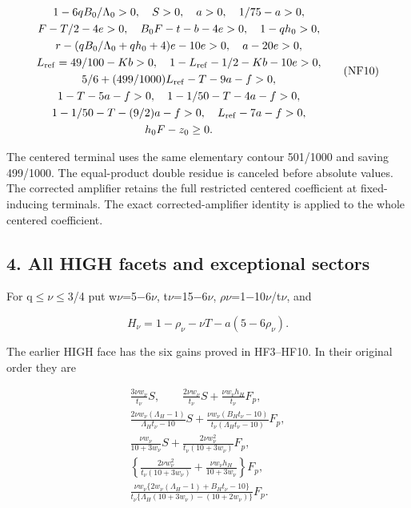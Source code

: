 \[
\begin{gathered}
1-6qB_0/\Lambda_0>0,\quad S>0,\quad a>0,\quad1/75-a>0,\\
F-T/2-4e>0,\quad B_0F-t-b-4e>0,\quad1-qh_0>0,\\
r-(qB_0/\Lambda_0+qh_0+4)e-10e>0,\quad a-20e>0,\\
L_{\rm ref}=49/100-Kb>0,\quad
1-L_{\rm ref}-1/2-Kb-10e>0,\\
5/6+(499/1000)L_{\rm ref}-T-9a-f>0,\\
1-T-5a-f>0,\quad1-1/50-T-4a-f>0,\\
1-1/50-T-(9/2)a-f>0,\quad L_{\rm ref}-7a-f>0,\\
h_0F-z_0\ge0.
\end{gathered}
\tag{NF10}
\]

The centered terminal uses the same elementary contour 501/1000 and saving 499/1000. The equal-product double residue is canceled before absolute values. The corrected amplifier retains the full restricted centered coefficient at fixed-inducing terminals. The exact corrected-amplifier identity is applied to the whole centered coefficient.

\hypertarget{feedback:all-high-facets-and-exceptional-sectors}{%
\subsection{4. All HIGH facets and exceptional sectors}\label{feedback:all-high-facets-and-exceptional-sectors}}

For q\ensuremath{\le}\ensuremath{\nu}\ensuremath{\le}3/4 put w\ensuremath{\nu}=5\ensuremath{-}6\ensuremath{\nu}, t\ensuremath{\nu}=15\ensuremath{-}6\ensuremath{\nu}, \ensuremath{\rho}\ensuremath{\nu}=1\ensuremath{-}10\ensuremath{\nu}/t\ensuremath{\nu}, and

\[
H_\nu=1-\rho_\nu-\nu T-a(5-6\rho_\nu).
\tag{NF11}
\]

The earlier HIGH face has the six gains proved in HF3--HF10. In their original order they are

\[
\begin{gathered}
\frac{3\nu w_\nu}{t_\nu}S,\qquad
\frac{2\nu w_\nu}{t_\nu}S+
\frac{\nu w_\nu h_H}{t_\nu}F_p,\\
\frac{2\nu w_\nu(\Lambda_H-1)}{\Lambda_Ht_\nu-10}S+
\frac{\nu w_\nu(B_Ht_\nu-10)}{t_\nu(\Lambda_Ht_\nu-10)}F_p,\\
\frac{\nu w_\nu}{10+3w_\nu}S+
\frac{2\nu w_\nu^2}{t_\nu(10+3w_\nu)}F_p,\\
\left\{\frac{2\nu w_\nu^2}{t_\nu(10+3w_\nu)}+
\frac{\nu w_\nu h_H}{10+3w_\nu}\right\}F_p,\\
\frac{\nu w_\nu\{2w_\nu(\Lambda_H-1)+B_Ht_\nu-10\}}
 {t_\nu\{\Lambda_H(10+3w_\nu)-(10+2w_\nu)\}}F_p.
\end{gathered}
\tag{NF12}
\]

